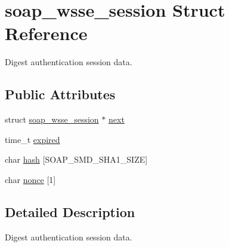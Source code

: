 \hypertarget{structsoap__wsse__session}{
\section{soap\_\-wsse\_\-session Struct Reference}
\label{structsoap__wsse__session}
}


Digest authentication session data.  


\subsection*{Public Attributes}
\begin{DoxyCompactItemize}
\item 
struct \hyperlink{structsoap__wsse__session}{soap\_\-wsse\_\-session} $\ast$ \hyperlink{structsoap__wsse__session_a5a118c7373f552f689bdf25bb0b9ad51}{next}
\item 
time\_\-t \hyperlink{structsoap__wsse__session_a0f424c1e05edb26c5e20426b3ab34d07}{expired}
\item 
char \hyperlink{structsoap__wsse__session_ad444a70e5ed626a29bc9559e6e8c24ff}{hash} \mbox{[}SOAP\_\-SMD\_\-SHA1\_\-SIZE\mbox{]}
\item 
char \hyperlink{structsoap__wsse__session_a840c2bd53ec4409fb6f355d2adbe16f8}{nonce} \mbox{[}1\mbox{]}
\end{DoxyCompactItemize}


\subsection{Detailed Description}
Digest authentication session data. 

